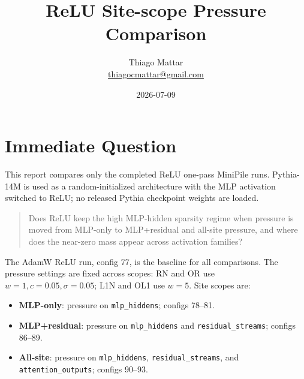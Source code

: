 \documentclass[10pt]{article}
\title{ReLU Site-scope Pressure Comparison}
\author{Thiago Mattar\\\href{mailto:thiagocmattar@gmail.com}{thiagocmattar@gmail.com}}
\date{2026-07-09}
\newcommand{\code}[1]{\texttt{#1}}
\newcommand{\tightsection}[1]{\section{#1}\vspace{-0.35em}}
\begin{document}
\maketitle
\vspace{-1.35em}

\tightsection{Immediate Question}

This report compares only the completed ReLU one-pass MiniPile runs. Pythia-14M is used as a random-initialized architecture with the MLP activation switched to ReLU; no released Pythia checkpoint weights are loaded.

\begin{quote}
Does ReLU keep the high MLP-hidden sparsity regime when pressure is moved from MLP-only to MLP+residual and all-site pressure, and where does the near-zero mass appear across activation families?
\end{quote}

The AdamW ReLU run, config 77, is the baseline for all comparisons. The pressure settings are fixed across scopes: RN and OR use \(w=1,c=0.05,\sigma=0.05\); L1N and OL1 use \(w=5\). Site scopes are:
\begin{itemize}
  \item \textbf{MLP-only}: pressure on \code{mlp\_hiddens}; configs 78--81.
  \item \textbf{MLP+residual}: pressure on \code{mlp\_hiddens} and \code{residual\_streams}; configs 86--89.
  \item \textbf{All-site}: pressure on \code{mlp\_hiddens}, \code{residual\_streams}, and \code{attention\_outputs}; configs 90--93.
\end{itemize}
\end{document}
